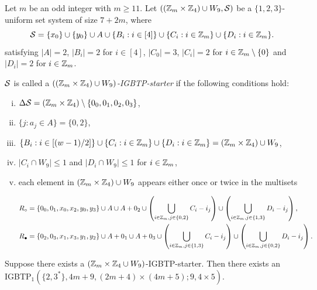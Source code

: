 \documentclass[draft, 11pt]{article}
\begin{document}
 \begin{definition}
 \label{defn:starter-igbtp-Z4} Let $m$ be an odd integer with $m\geq 11$. 
 Let $((\mathbb Z_m\times\mathbb Z_4)\cup W_9,\mathcal S)$ be a $\{1,2,3\}$-uniform set system of size $7+2m$, where
 \begin{equation*}
 \mathcal S =\{x_0\}\cup \{y_0\} \cup A\cup \{B_i: i\in [4]\}\cup \{C_i: i\in \mathbb Z_{m}\} \cup \{D_i: i\in \mathbb Z_{m}\}.
 \end{equation*}
 satisfying $|A|=2$, $|B_i|=2$ for $i\in [4]$,
 $|C_0|=3$, $|C_i|=2$ for $i\in \mathbb Z_m\setminus\{0\}$ and $|D_i|=2$ for $i\in\mathbb Z_m$.

$\mathcal S$ is called a {\em $((\mathbb Z_m\times\mathbb Z_4)\cup W_9)$-IGBTP-starter} if the following
conditions hold:
\begin{enumerate}[(i)]
\item $\Delta\mathcal S=(\mathbb Z_m\times\mathbb Z_4)\setminus\{0_0, 0_1,0_2,0_3\}$,
\item $\{j: a_j\in A\}=\{0,2\}$,
\item $\{B_i: i\in [(w-1)/2]\}\cup \{C_i: i\in \mathbb Z_{m}\}\cup \{D_i: i\in \mathbb Z_{m}\}=(\mathbb Z_m\times\mathbb Z_4)\cup W_9$,
\item $|C_i\cap W_9|\le 1$ and $|D_i\cap W_9|\le 1$ for $i\in\mathbb Z_m$,
\item each element in $(\mathbb Z_{m}\times\mathbb Z_4) \cup W_9$ appears either once or twice in the multisets

{\small
\begin{align*}
R_\circ &=  \{0_0,0_1,x_0,x_2,y_0,y_3\} \cup A\cup A+0_2
 \cup \left( \bigcup_{i\in \mathbb Z_{m}, j\in \{0,2\}} C_i-i_j\right)
 \cup \left( \bigcup_{i\in \mathbb Z_{m}, j\in\{1,3\}} D_i-i_j\right),\\
 R_\bullet &= \{0_2,0_3,x_1,x_3,y_1,y_2\} \cup A+0_1\cup A+0_3
  \cup \left( \bigcup_{i\in \mathbb Z_{m}, j\in \{1,3\}} C_i-i_j\right)
 \cup \left( \bigcup_{i\in \mathbb Z_{m}, j\in\{0,2\}} D_i-i_j\right).
\end{align*}}
\end{enumerate}
\end{definition}



 \begin{proposition}\label{prop:starter-igbtp-Z4}
 Suppose there exists a $(\mathbb Z_m\times \mathbb Z_4\cup W_9)$-IGBTP-starter.
 Then there exists
 an IGBTP$_1(\{2,3^*\},4m+9,(2m+4)\times (4m+5);9,4\times 5 )$.
 \end{proposition}
\end{document}
